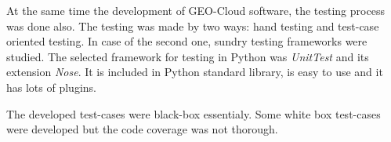 At the same time the development of GEO-Cloud software, the testing process was
done also. The testing was made by two ways: hand testing and test-case oriented
testing. In case of the second one, sundry testing frameworks were studied.
The selected framework for testing in Python was \emph{UnitTest} and its
extension \emph{Nose}. It is included in Python standard library, is easy to use
and it has lots of plugins. 

The developed test-cases were black-box essentialy. Some white box test-cases
were developed but the code coverage was not thorough. 
